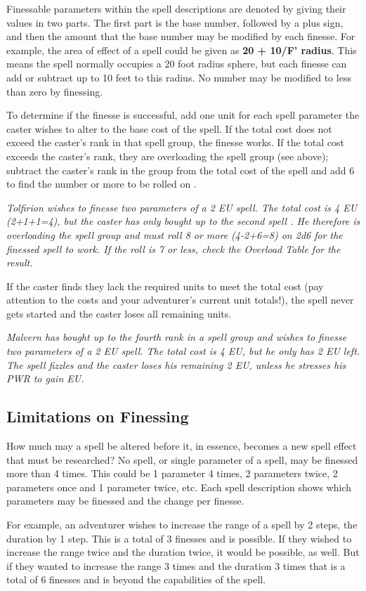 \begin{multicols*}{2}
Finessable parameters within the spell descriptions are denoted by giving their values in two parts. The first part is the base number, followed by a plus sign, and then the
amount that the base number may be modified by each finesse. For example, the area of effect of a spell could be given as \textbf{20 + 10/F' radius}. This means the spell normally occupies a 20 foot radius sphere, but each finesse can add or subtract up to 10 feet to this radius. No number may be modified to less than zero by finessing.

To determine if the finesse is successful, add one unit for each spell parameter the caster wishes to alter to the base cost of the spell. If the total cost does not exceed the caster's rank in that spell group, the finesse works. If the total cost exceeds the caster's rank, they are overloading the spell group (see above); subtract the caster's rank in the group from the total cost of the spell and add 6 to find the number or more to be rolled on .

\textit{Tolfirion wishes to finesse two parameters of a 2 EU spell. The total cost is 4 EU (2+1+1=4), but the caster has only bought up to the second spell . He therefore is overloading the spell group and must roll 8 or more (4-2+6=8) on 2d6 for the finessed spell to work. If the roll is 7 or less, check the Overload Table for the result.}

If the caster finds they lack the required units to meet the total cost (pay attention to the costs and your adventurer's current unit totals!), the spell never gets started and the caster loses all remaining units.

\textit{Malvern has bought up to the fourth rank in a spell group and wishes to finesse two parameters of a 2 EU spell. The total cost is 4 EU, but he only has 2 EU left. The spell fizzles and the caster loses his remaining 2 EU, unless he stresses his PWR to gain EU.}
\subsection{Limitations on Finessing}
How much may a spell be altered before it, in essence, becomes a new spell effect that must be researched? No spell, or single parameter of a spell, may be finessed more
than 4 times. This could be 1 parameter 4 times, 2 parameters twice, 2 parameters once and 1 parameter twice, etc. Each spell description shows which parameters may be finessed and the change per finesse.

For example, an adventurer wishes to increase the range of a spell by 2 steps, the duration by 1 step. This is a total of 3 finesses and is possible. If they wished to increase the range twice and the duration twice, it would be possible, as well. But if they wanted to increase the range 3 times and the duration 3 times that is a total of 6 finesses and is beyond the capabilities of the spell.

\end{multicols*}
